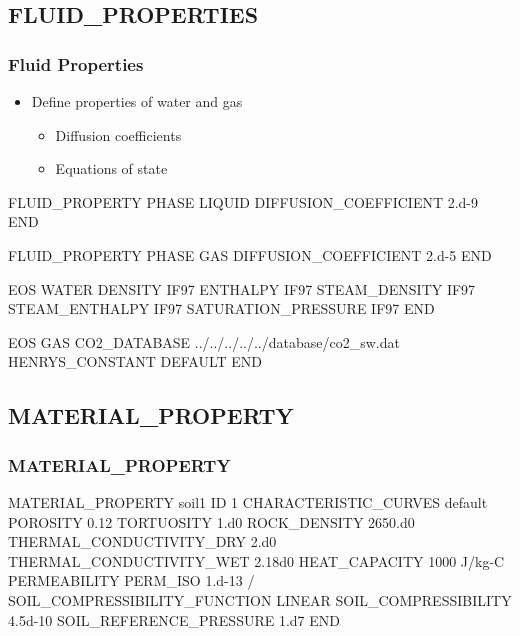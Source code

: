 \documentclass{beamer}
\begin{document}
\subsection{FLUID\_PROPERTIES}
\begin{frame}\frametitle{Fluid Properties}

\begin{itemize}
  \item Define properties of water and gas
  \begin{itemize}
    \item Diffusion coefficients
    \item Equations of state
  \end{itemize}
\end{itemize}

\begin{semiverbatim}
FLUID_PROPERTY
  PHASE LIQUID
  DIFFUSION_COEFFICIENT 2.d-9
END

FLUID_PROPERTY
  PHASE GAS
  DIFFUSION_COEFFICIENT 2.d-5
END

\newpage

EOS WATER
  DENSITY IF97
  ENTHALPY IF97
  STEAM_DENSITY IF97
  STEAM_ENTHALPY IF97
  SATURATION_PRESSURE IF97
END

EOS GAS
  CO2_DATABASE ../../../../../database/co2_sw.dat
  HENRYS_CONSTANT DEFAULT
END

\end{semiverbatim}

\end{frame}
\subsection{MATERIAL\_PROPERTY}

\begin{frame}\frametitle{MATERIAL\_PROPERTY}

\begin{semiverbatim}
MATERIAL_PROPERTY soil1
  ID 1
  CHARACTERISTIC_CURVES default
  POROSITY 0.12
  TORTUOSITY 1.d0
  ROCK_DENSITY 2650.d0
  THERMAL_CONDUCTIVITY_DRY 2.d0
  THERMAL_CONDUCTIVITY_WET 2.18d0
  HEAT_CAPACITY 1000 J/kg-C
  PERMEABILITY
    PERM_ISO 1.d-13
  /
  SOIL_COMPRESSIBILITY_FUNCTION LINEAR
  SOIL_COMPRESSIBILITY 4.5d-10
  SOIL_REFERENCE_PRESSURE 1.d7
END
\end{semiverbatim}

\end{frame}
\end{document}
